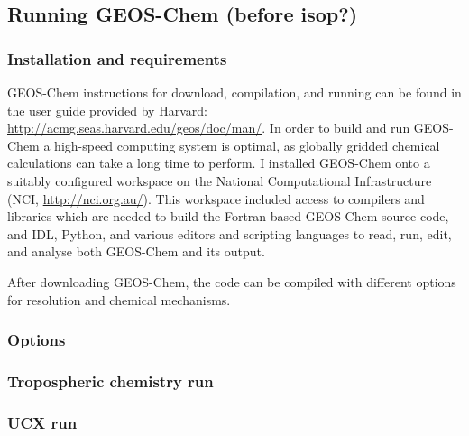   \subsection{Running GEOS-Chem (before isop?)}
  \label{Model:GC:running}
    \subsubsection{Installation and requirements}
      GEOS-Chem instructions for download, compilation, and running can be found in the user guide provided by Harvard: \url{http://acmg.seas.harvard.edu/geos/doc/man/}.
      In order to build and run GEOS-Chem a high-speed computing system is optimal, as globally gridded chemical calculations can take a long time to perform.
      I installed GEOS-Chem onto a suitably configured workspace on the National Computational Infrastructure (NCI, \url{http://nci.org.au/}). 
      This workspace included access to compilers and libraries which are needed to build the Fortran based GEOS-Chem source code, and IDL, Python, and various editors and scripting languages to read, run, edit, and analyse both GEOS-Chem and its output.
        
      After downloading GEOS-Chem, the code can be compiled with different options for resolution and chemical mechanisms.
    \subsubsection{Options}
    
    \subsubsection{Tropospheric chemistry run}
    
    \subsubsection{UCX run}
    
